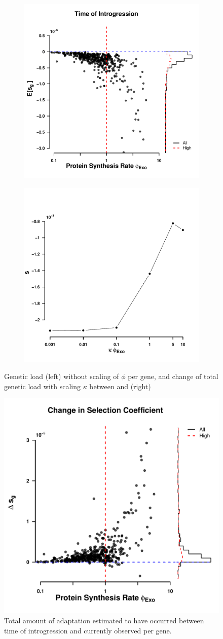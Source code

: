 \documentclass[fleqn,letterpaper]{article}
\begin{document}
\begin{figure}
    \centering
    \begin{subfigure}
        \centering
        \includegraphics[width=.45\textwidth]{img/fitness_difference_gos_kappa1.pdf}
    \end{subfigure}
    \begin{subfigure}
        \centering
        \includegraphics[width=.45\textwidth]{img/fitness_phi_scaling_gos.pdf}
    \end{subfigure}
    \caption{Genetic load (left) without scaling of $\phi$ per gene, and change of total genetic load with scaling $\kappa$ between \gossypii and \kluyveri (right)}
    \label{fig:sne_scaling}
\end{figure}
\null
\vfill
\clearpage
\null
\vfill
\begin{figure}
     \centering
	\includegraphics[width=.5\textwidth]{img/adaptation_total.pdf}
	\caption{Total amount of adaptation estimated to have occurred between time of introgression and currently observed per gene.}
	\label{fig:adapt_tot}
\end{figure}
\null
\vfill
\clearpage
\end{document}
